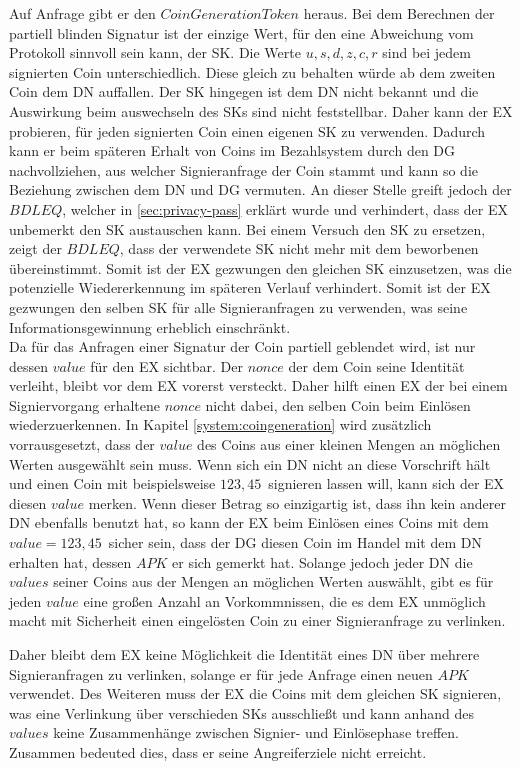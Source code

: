 \documentclass[
	fontsize=11pt,
	headings=small,
	parskip=half,           %
	bibliography=totoc,
	numbers=noenddot,       %
	open=any,               %
]{scrreprt}
\begin{document}
Auf Anfrage gibt er den $CoinGenerationToken$ heraus. Bei dem Berechnen der partiell blinden Signatur ist der einzige Wert, für den eine Abweichung vom Protokoll sinnvoll sein kann, der SK. Die Werte $u,s,d,z,c,r$ sind bei jedem signierten Coin unterschiedlich. Diese gleich zu behalten würde ab dem zweiten Coin dem DN auffallen. Der SK hingegen ist dem DN nicht bekannt und die Auswirkung beim auswechseln des SKs sind nicht feststellbar. Daher kann der EX probieren, für jeden signierten Coin einen eigenen SK zu verwenden. Dadurch kann er beim späteren Erhalt von Coins im Bezahlsystem durch den DG nachvollziehen, aus welcher Signieranfrage der Coin stammt und kann so die Beziehung zwischen dem DN und DG vermuten. An dieser Stelle greift jedoch der $BDLEQ$, welcher in \ref{sec:privacy-pass} erklärt wurde und verhindert, dass der EX unbemerkt den SK austauschen kann. Bei einem Versuch den SK zu ersetzen, zeigt der $BDLEQ$, dass der verwendete SK nicht mehr mit dem beworbenen übereinstimmt. Somit ist der EX gezwungen den gleichen SK einzusetzen, was die potenzielle Wiedererkennung im späteren Verlauf verhindert. Somit ist der EX gezwungen den selben SK für alle Signieranfragen zu verwenden, was seine Informationsgewinnung erheblich einschränkt.\\

Da für das Anfragen einer Signatur der Coin partiell geblendet wird, ist nur dessen $value$ für den EX sichtbar. Der $nonce$ der dem Coin seine Identität verleiht, bleibt vor dem EX vorerst versteckt. Daher hilft einen EX der bei einem Signiervorgang erhaltene $nonce$ nicht dabei, den selben Coin beim Einlösen wiederzuerkennen. In Kapitel \ref{system:coingeneration} wird zusätzlich vorrausgesetzt, dass der $value$ des Coins aus einer kleinen Mengen an möglichen Werten ausgewählt sein muss. Wenn sich ein DN nicht an diese Vorschrift hält und einen Coin mit beispielsweise $123,45$\texteuro\ signieren lassen will, kann sich der EX diesen $value$ merken. Wenn dieser Betrag so einzigartig ist, dass ihn kein anderer DN ebenfalls benutzt hat, so kann der EX beim Einlösen eines Coins mit dem $value = 123,45$\texteuro\ sicher sein, dass der DG diesen Coin im Handel mit dem DN erhalten hat, dessen $APK$ er sich gemerkt hat. Solange jedoch jeder DN die $values$ seiner Coins aus der Mengen an möglichen Werten auswählt, gibt es für jeden $value$ eine großen Anzahl an Vorkommnissen, die es dem EX unmöglich macht mit Sicherheit einen eingelösten Coin zu einer Signieranfrage zu verlinken.

Daher bleibt dem EX keine Möglichkeit die Identität eines DN über mehrere Signieranfragen zu verlinken, solange er für jede Anfrage einen neuen $APK$ verwendet. Des Weiteren muss der EX die Coins mit dem gleichen SK signieren, was eine Verlinkung über verschieden SKs ausschließt und kann anhand des $values$ keine Zusammenhänge zwischen Signier- und Einlösephase treffen. Zusammen bedeuted dies, dass er seine Angreiferziele nicht erreicht.
\end{document}
